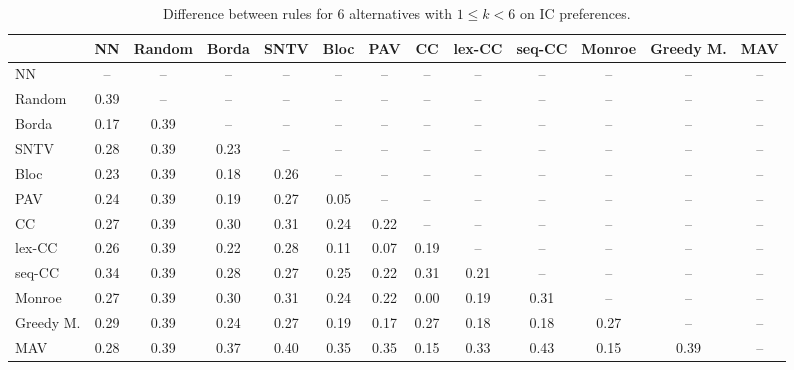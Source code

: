 
\begin{table*}[h!]
\centering
\begin{tabular}{lcccccccccccc}
\toprule
 & NN & Random & Borda & SNTV & Bloc & PAV & CC & lex-CC & seq-CC & Monroe & Greedy M. & MAV \\
\midrule
NN & -- & -- & -- & -- & -- & -- & -- & -- & -- & -- & -- & -- \\
Random & 0.39 & -- & -- & -- & -- & -- & -- & -- & -- & -- & -- & -- \\
Borda & 0.17 & 0.39 & -- & -- & -- & -- & -- & -- & -- & -- & -- & -- \\
SNTV & 0.28 & 0.39 & 0.23 & -- & -- & -- & -- & -- & -- & -- & -- & -- \\
Bloc & 0.23 & 0.39 & 0.18 & 0.26 & -- & -- & -- & -- & -- & -- & -- & -- \\
PAV & 0.24 & 0.39 & 0.19 & 0.27 & 0.05 & -- & -- & -- & -- & -- & -- & -- \\
CC & 0.27 & 0.39 & 0.30 & 0.31 & 0.24 & 0.22 & -- & -- & -- & -- & -- & -- \\
lex-CC & 0.26 & 0.39 & 0.22 & 0.28 & 0.11 & 0.07 & 0.19 & -- & -- & -- & -- & -- \\
seq-CC & 0.34 & 0.39 & 0.28 & 0.27 & 0.25 & 0.22 & 0.31 & 0.21 & -- & -- & -- & -- \\
Monroe & 0.27 & 0.39 & 0.30 & 0.31 & 0.24 & 0.22 & 0.00 & 0.19 & 0.31 & -- & -- & -- \\
Greedy M. & 0.29 & 0.39 & 0.24 & 0.27 & 0.19 & 0.17 & 0.27 & 0.18 & 0.18 & 0.27 & -- & -- \\
MAV & 0.28 & 0.39 & 0.37 & 0.40 & 0.35 & 0.35 & 0.15 & 0.33 & 0.43 & 0.15 & 0.39 & -- \\
\bottomrule
\end{tabular}

\caption{Difference between rules for 6 alternatives with $1 \leq k < 6$ on IC preferences.}
\end{table*}
